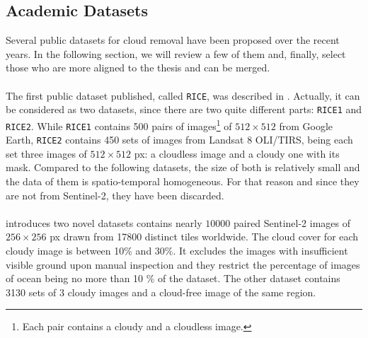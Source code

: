 \documentclass[11pt, a4paper]{article}
\begin{document}
	\subsection{Academic Datasets}
	Several public datasets for cloud removal have been proposed over the recent years. In the following section, we will review a few of them and, finally, select those who are more aligned to the thesis and can be merged.
	\\
	\\
	The first public dataset published, called \texttt{RICE}, was described in \cite{rice}. Actually, it can be considered as two datasets, since there are two quite different parts: \texttt{RICE1} and \texttt{RICE2}. While \texttt{RICE1} contains 500 pairs of images\footnote{Each pair contains a cloudy and a cloudless image.} of $512 \times 512$ from Google Earth, \texttt{RICE2} contains 450 sets of images from Landsat 8 OLI/TIRS, being each set three images of $512 \times 512$ px: a cloudless image and a cloudy one with its mask. Compared to the following datasets, the size of both is relatively small and the data of them is spatio-temporal homogeneous. For that reason and since they are not from Sentinel-2, they have been discarded.
	\\
	\\
	\cite{sarukkai2019cloud} introduces two novel datasets contains nearly $10000$ paired Sentinel-2 images of $256 \times 256$ px	drawn from 17800 distinct tiles worldwide. The cloud cover for each cloudy image is between 10\% and 30\%. It excludes the images with insufficient visible ground upon manual inspection and they restrict the percentage of images of ocean being no more than 10 \% of the dataset. The other dataset contains 3130 sets of 3 cloudy images and a cloud-free image of the same region.
\end{document}
